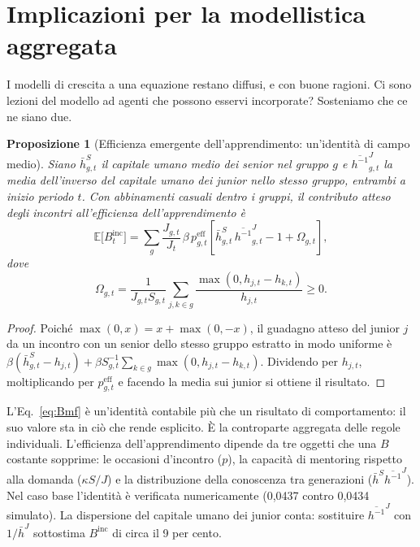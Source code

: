 \documentclass[preprint,12pt,authoryear]{elsarticle}
\newtheorem{proposition}{Proposizione}
\begin{document}
\section{Implicazioni per la modellistica aggregata}\label{sec:aggregate}

I modelli di crescita a una equazione restano diffusi, e con buone ragioni. Ci sono lezioni del modello ad agenti che possono esservi incorporate? Sosteniamo che ce ne siano due.

\begin{proposition}[Efficienza emergente dell'apprendimento: un'identità di campo medio]\label{prop:B}
Siano $\bar h^S_{g,t}$ il capitale umano medio dei senior nel gruppo $g$ e $\overline{h^{-1}}^{J}_{g,t}$ la media dell'inverso del capitale umano dei junior nello stesso gruppo, entrambi a inizio periodo $t$. Con abbinamenti casuali dentro i gruppi, il contributo atteso degli incontri all'efficienza dell'apprendimento è
\begin{equation}\label{eq:Bmf}
\mathbb E\big[B^{\mathrm{inc}}_t\big] = \sum_g \frac{J_{g,t}}{J_t}\,\beta\, p^{\mathrm{eff}}_{g,t} \left[\bar h^S_{g,t}\, \overline{h^{-1}}^{J}_{g,t} - 1 + \Omega_{g,t}\right],
\end{equation}
dove
\begin{equation*}
\Omega_{g,t} = \frac{1}{J_{g,t} S_{g,t}}\sum_{j,k\in g}\frac{\max(0,h_{j,t}-h_{k,t})}{h_{j,t}} \ge 0 .
\end{equation*}
\end{proposition}
\begin{proof}
Poiché $\max(0,x) = x + \max(0,-x)$, il guadagno atteso del junior $j$ da un incontro con un senior dello stesso gruppo estratto in modo uniforme è $\beta(\bar h^S_{g,t} - h_{j,t}) + \beta S_{g,t}^{-1}\sum_{k\in g} \max(0, h_{j,t}-h_{k,t})$. Dividendo per $h_{j,t}$, moltiplicando per $p^{\mathrm{eff}}_{g,t}$ e facendo la media sui junior si ottiene il risultato.
\end{proof}

L'Eq.~\eqref{eq:Bmf} è un'identità contabile più che un risultato di comportamento: il suo valore sta in ciò che rende esplicito. È la controparte aggregata delle regole individuali. L'efficienza dell'apprendimento dipende da tre oggetti che una $B$ costante sopprime: le occasioni d'incontro ($p$), la capacità di mentoring rispetto alla domanda ($\kappa S/J$) e la distribuzione della conoscenza tra generazioni ($\bar h^S \overline{h^{-1}}^J$). Nel caso base l'identità è verificata numericamente (0,0437 contro 0,0434 simulato). La dispersione del capitale umano dei junior conta: sostituire $\overline{h^{-1}}^J$ con $1/\bar h^J$ sottostima $B^{\mathrm{inc}}$ di circa il 9 per cento.
\end{document}

